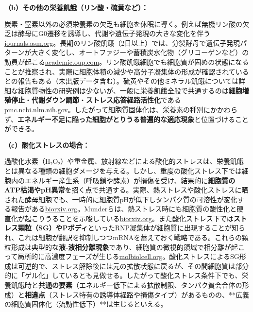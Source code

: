 \textbf{（b）その他の栄養飢餓（リン酸・硫黄など）：}

 炭素・窒素以外の必須栄養素の欠乏も細胞を休眠に導く。例えば無機リン酸の欠乏は酵母にG0遷移を誘導し、代謝や遺伝子発現の大きな変化を伴う\href{https://journals.asm.org/doi/10.1128/mbio.00241-25\#:~:text=Fission\%20yeast\%20metabolome\%20dynamics\%20during,a\%20state\%20of\%20G0\%20quiescence}{journals.asm.org}。長期のリン酸飢餓（2日以上）では、分裂酵母で遺伝子発現パターンが大きく変化し、オートファジーや蓄積炭水化物（グリコーゲンなど）の動員が起こる\href{https://academic.oup.com/nar/article/51/7/3094/7041946\#:~:text=Cellular\%20responses\%20to\%20long,expression\%20whereby\%20the\%20mRNAs}{academic.oup.com}。リン酸飢餓細胞でも細胞質が固めの状態になることが推察され、実際に細胞体積の減少や高分子凝集体の形成が確認されているとの報告もある（未出版データ含む）。硫黄やその他ミネラル飢餓については詳細な細胞質物性の研究例は少ないが、一般に栄養飢餓全般で共通するのは\textbf{細胞増殖停止}・\textbf{代謝ダウン調節}・\textbf{ストレス応答経路活性化}である\href{https://pmc.ncbi.nlm.nih.gov/articles/PMC3123465/\#:~:text=,0\%E2\%80\%93111\%20mm}{pmc.ncbi.nlm.nih.gov}。したがって細胞質固体化は、栄養素の種別にかかわらず、\textbf{エネルギー不足に陥った細胞がとりうる普遍的な適応現象}と位置づけることができる。

\textbf{（c）酸化ストレスの場合：}

 過酸化水素（H₂O₂）や重金属、放射線などによる酸化的ストレスは、栄養飢餓とは異なる種類の細胞ダメージを与える。しかし、重度の酸化ストレス下では細胞内のエネルギー産生系（呼吸鎖や酵素）が損傷を受け、結果的に\textbf{細胞質のATP枯渇やpH異常}を招く点で共通する。実際、熱ストレスや酸化ストレスに晒された酵母細胞でも、一時的に細胞質pHが低下しタンパク質の可溶性が変化する報告がある\href{https://www.biorxiv.org/content/10.1101/2022.07.29.502016v1.full\#:~:text=Exit\%20of\%20spore\%20dormancy\%20transforms,including\%20during\%20heat}{biorxiv.org}。Munderらは、熱ストレス時にも細胞質の酸性化と硬直化が起こりうることを示唆している\href{https://www.biorxiv.org/content/10.1101/2022.07.29.502016v1.full\#:~:text=Exit\%20of\%20spore\%20dormancy\%20transforms,including\%20during\%20heat}{biorxiv.org}。また酸化ストレス下では\textbf{ストレス顆粒（SG）\textbf{や}Pボディ}といったRNP凝集体が細胞質に出現することが知られ、これは細胞が翻訳を抑制しつつmRNAを蓄えておく戦略である。これらの顆粒形成は典型的な\textbf{液-液相分離現象}であり、細胞質の微視的領域で相分離が起こって局所的に高濃度フェーズが生じる\href{https://www.molbiolcell.org/doi/10.1091/mbc.E20-02-0125\#:~:text=Reorganization\%20of\%20budding\%20yeast\%20cytoplasm,de\%20novo\%20formation\%20of}{molbiolcell.org}。酸化ストレスによるSG形成は可逆的で、ストレス解除後には元の拡散状態に戻るが、その間細胞質は部分的に「ゲル化」しているとも見做せる。したがって酸化ストレス条件下でも、栄養飢餓時と\textbf{共通の要素}（エネルギー低下による拡散制限、タンパク質会合体の形成）と\textbf{相違点}（ストレス特有の誘導体経路や損傷タイプ）があるものの、**広義の細胞質固体化（流動性低下）**は生じるといえる。

